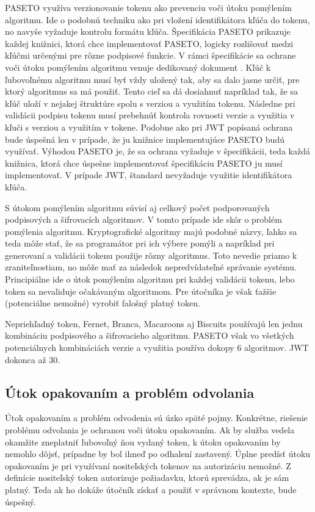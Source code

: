 PASETO využíva verzionovanie tokenu ako prevenciu voči útoku pomýlením algoritmu. Ide o podobnú techniku ako pri vložení identifikátora kľúča do tokenu, no navyše vyžaduje kontrolu formátu kľúča. Špecifikácia PASETO \cite{paseto_git} prikazuje každej knižnici, ktorá chce implementovať PASETO, logicky rozlišovať medzi kľúčmi určenými pre rôzne podpisové funkcie. V rámci špecifikácie sa ochrane voči útoku pomýlením algoritmu venuje dedikovaný dokument \cite{alg_lucidity}. Kľúč k ľubovoľnému algoritmu musí byť vždy uložený tak, aby sa dalo jasne určiť, pre ktorý algoritmus sa má použiť. Tento cieľ sa dá dosiahnuť napríklad tak, že sa kľúč uloží v nejakej štruktúre spolu s verziou a využitím tokenu. Následne pri validácii podpisu tokenu musí prebehnúť kontrola rovnosti verzie a využitia v kľuči s verziou a využitím v tokene. Podobne ako pri JWT popísaná ochrana bude úspešná len v prípade, že ju knižnice implementujúce PASETO budú využívať. Výhodou PASETO je, že sa ochrana vyžaduje v špecifikácii, teda každá knižnica, ktorá chce úspešne implementovať špecifikáciu PASETO ju musí implementovať. V prípade JWT, štandard \cite{jwt_rfc} nevyžaduje využitie identifikátora kľúča.

S útokom pomýlením algoritmu súvisí aj celkový počet podporovaných podpisových a šifrovacích algoritmov. V tomto prípade ide skôr o problém pomýlenia algoritmu. Kryptografické algoritmy majú podobné názvy, ľahko sa teda môže stať, že sa programátor pri ich výbere pomýli a napríklad pri generovaní a validácii tokenu použije rôzny algoritmus. Toto nevedie priamo k zraniteľnostiam, no môže mať za následok nepredvídateľné správanie systému. Principiálne ide o útok pomýlením algoritmu pri každej validácii tokenu, lebo token sa nevaliduje očakávaným algoritmom. Pre útočníka je však ťažšie (potenciálne nemožné) vyrobiť falošný platný token.

Nepriehľadný token, Fernet, Branca, Macaroons aj Biscuits používajú len jednu kombináciu podpisového a šifrovacieho algoritmu. PASETO však vo všetkých potenciálnych kombináciách verzie a využitia používa dokopy 6 algoritmov. JWT dokonca až 30.

\subsection{Útok opakovaním a problém odvolania}

\label{sec:replay} %

Útok opakovaním a problém odvodenia sú úzko späté pojmy. Konkrétne, riešenie problému odvolania je ochranou voči útoku opakovaním. Ak by služba vedela okamžite zneplatniť ľubovoľný ňou vydaný token, k útoku opakovaním by nemohlo dôjsť, prípadne by bol ihneď po odhalení zastavený. Úplne predísť útoku opakovaním je pri využívaní nositeľských tokenov na autorizáciu nemožné. Z definície nositeľský token autorizuje požiadavku, ktorú sprevádza, ak je sám platný. Teda ak ho dokáže útočník získať a použiť v správnom kontexte, bude úspešný.

